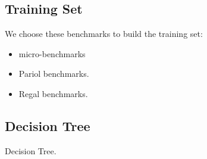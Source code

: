 \subsection{Training Set}

We choose these benchmarks to build the training set:

\begin{itemize}

\item micro-benchmarks

\item Pariol benchmarks.

\item Regal benchmarks.

\end{itemize}

\subsection{Decision Tree}
\label{subsec:decisiontree}

Decision Tree.

